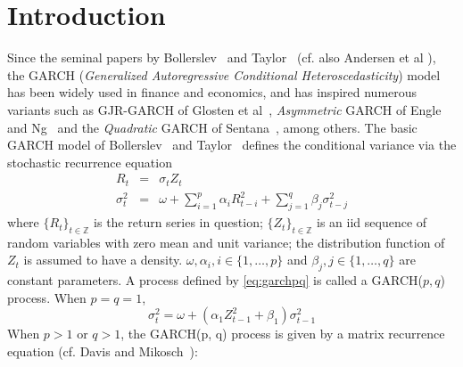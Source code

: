 \documentclass[aoas,preprint]{imsart}
\numberwithin{equation}{section}
\theoremstyle{plain}
\begin{document}
\section{Introduction}
Since the seminal papers by Bollerslev~\cite{bollerslev:1986} and 
Taylor~\cite{taylor:2008} (cf. also Andersen et al
\cite{andersen:davis:kreiss:mikosch:2009}), the GARCH 
({\em Generalized Autoregressive Conditional Heteroscedasticity}) model
has been widely used in finance and economics, and has
inspired numerous variants such as GJR-GARCH of Glosten et
al~\cite{glosten:1993}, {\em Asymmetric} GARCH of Engle and
Ng~\cite{engle:Ng:1993} and the {\em Quadratic} GARCH of
Sentana~\cite{sentana:1995}, among others. The basic GARCH model of
Bollerslev~\cite{bollerslev:1986} and Taylor~\cite{taylor:2008}
defines the conditional variance via the stochastic recurrence
equation
\begin{eqnarray}
  R_t &=& \sigma_t Z_t \nonumber \\
  \sigma_{t}^2 &=& \omega + \sum_{i=1}^p \alpha_i R_{t-i}^2 +
  \sum_{j=1}^q \beta_j \sigma_{t-j}^2   \label{eq:garchpq}
\end{eqnarray}
where $\{R_t\}_{t \in \mathbb Z}$ is the return series in question;
$\{Z_t\}_{t \in \mathbb Z}$ is an iid sequence of random variables
with zero mean and unit variance; the distribution function of $Z_t$
is assumed to have a density.
$\omega, \alpha_i, i \in \{1,\dots,p\}$ and
$\beta_j, j \in \{1,\dots,q\}$ are constant parameters. A process
defined by \eqref{eq:garchpq} is called a GARCH($p,q$) process.
When $p = q = 1$,
\[
\sigma_t^2 = \omega + (\alpha_1 Z_{t-1}^2 + \beta_1) \sigma_{t-1}^2
\]
When $p > 1$ or $q > 1$, the GARCH(p, q) process is given by
a matrix recurrence equation (cf. Davis and
Mikosch~\cite{davis:mikosch:2001}):
\end{document}
